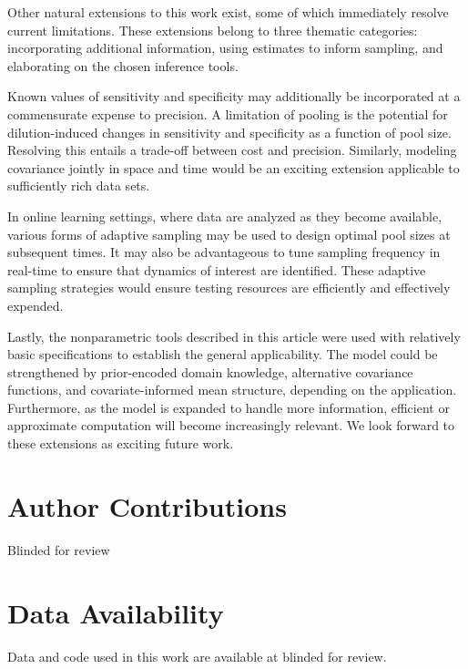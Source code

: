 \documentclass{article}
\begin{document}
Other natural extensions to this work exist, some of which immediately resolve current limitations. These extensions belong to three thematic categories: incorporating additional information, using estimates to inform sampling, and elaborating on the chosen inference tools.

Known values of sensitivity and specificity may additionally be incorporated at a commensurate expense to precision. A limitation of pooling is the potential for dilution-induced changes in sensitivity and specificity as a function of pool size. Resolving this entails a trade-off between cost and precision. Similarly, modeling covariance jointly in space and time would be an exciting extension applicable to sufficiently rich data sets. 

In online learning settings, where data are analyzed as they become available, various forms of adaptive sampling may be used to design optimal pool sizes at subsequent times. It may also be advantageous to tune sampling frequency in real-time to ensure that dynamics of interest are identified. These adaptive sampling strategies would ensure testing resources are efficiently and effectively expended.

Lastly, the nonparametric tools described in this article were used with relatively basic specifications to establish the general applicability. The model could be strengthened by prior-encoded domain knowledge, alternative covariance functions, and covariate-informed mean structure, depending on the application. Furthermore, as the model is expanded to handle more information, efficient or approximate computation will become increasingly relevant. We look forward to these extensions as exciting future work. 

\section*{Author Contributions}
Blinded for review

\section*{Data Availability}
Data and code used in this work are available at blinded for review.



  
  
\end{document}

